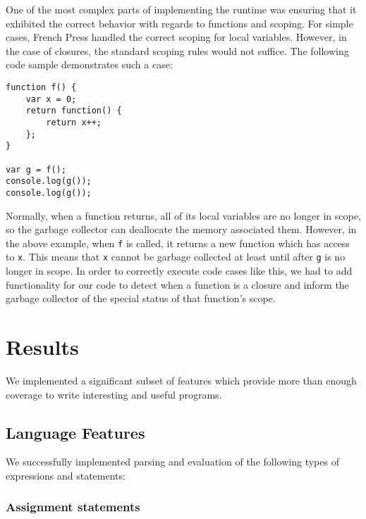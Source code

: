 \documentclass{article}
\begin{document}
\begin{multicols}{2}
One of the most complex parts of implementing the runtime was ensuring that it
exhibited the correct behavior with regards to functions and scoping. For simple
cases, French Press handled the correct scoping for local variables. However,
in the case of closures, the standard scoping rules would not suffice. The
following code sample demonstrates such a case:

\vspace{3mm}

\begin{lstlisting}
function f() {
    var x = 0;
    return function() {
        return x++;
    };
}

var g = f();
console.log(g());
console.log(g());

\end{lstlisting}

\vspace{3mm}

Normally, when a function returns, all of its local variables are no longer in
scope, so the garbage collector can deallocate the memory associated them.
However, in the above example, when \texttt{f} is called, it returns a new
function which has access to \texttt{x}. This means that \texttt{x} cannot
be garbage collected at least until after \texttt{g} is no longer in scope.
In order to correctly execute code cases like this, we had to add functionality
for our code to detect when a function is a closure and inform the garbage
collector of the special status of that function's scope.

\section{Results}

We implemented a significant subset of features which provide more than enough
coverage to write interesting and useful programs.

\subsection{Language Features}

We successfully implemented parsing and evaluation of the following types of
expressions and statements:

\subsubsection*{Assignment statements}


\end{multicols}
\end{document}
